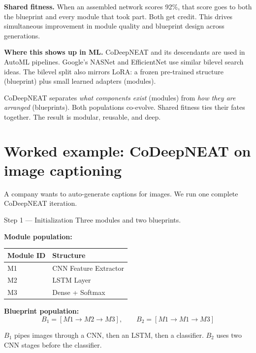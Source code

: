 \documentclass[a4paper,11pt]{article}
\begin{document}
\noindent\textbf{Shared fitness.}
When an assembled network scores 92\%, that score goes to both the
blueprint and every module that took part.
Both get credit.
This drives simultaneous improvement in module quality and blueprint
design across generations.

\textbf{Where this shows up in ML.}
CoDeepNEAT and its descendants are used in AutoML pipelines.
Google's NASNet and EfficientNet use similar bilevel search ideas.
The bilevel split also mirrors LoRA: a frozen pre-trained structure
(blueprint) plus small learned adapters (modules).

\begin{keytake}
CoDeepNEAT separates \emph{what components exist} (modules) from
\emph{how they are arranged} (blueprints).
Both populations co-evolve.
Shared fitness ties their fates together.
The result is modular, reusable, and deep.
\end{keytake}

\section{Worked example: CoDeepNEAT on image captioning}

A company wants to auto-generate captions for images.
We run one complete CoDeepNEAT iteration.

\begin{worked}{Step 1 --- Initialization}
Three modules and two blueprints.

\noindent\textbf{Module population:}
\begin{center}\small
\begin{tabular}{@{}ll@{}}
\toprule
\textbf{Module ID} & \textbf{Structure} \\
\midrule
M1 & CNN Feature Extractor \\
M2 & LSTM Layer \\
M3 & Dense + Softmax \\
\bottomrule
\end{tabular}
\end{center}

\noindent\textbf{Blueprint population:}
\[
  B_1 = [M1 \to M2 \to M3], \qquad B_2 = [M1 \to M1 \to M3]
\]

$B_1$ pipes images through a CNN, then an LSTM, then a classifier.
$B_2$ uses two CNN stages before the classifier.
\end{worked}
\end{document}
